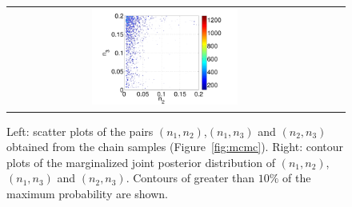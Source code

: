 \begin{figure}[ht]
\begin{tabular}{clc}
\includegraphics[width=0.475\textwidth]{./figures/jpdf23.pdf}
        \end{tabular}
\caption{Left: scatter plots of the pairs $(n_1,n_2)$,$(n_1,n_3)$ and $(n_2,n_3)$ obtained from the
chain samples (Figure~\ref{fig:mcmc}). 
Right: contour plots of the marginalized joint posterior distribution of $(n_1,n_2)$,$(n_1,n_3)$ and $(n_2,n_3)$.  Contours of greater than $10\%$ of the maximum probability are shown.}
\label{fig:joint} 
        \end{figure}
